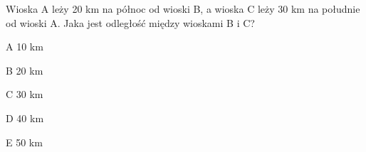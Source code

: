 \begin{tresc}
Wioska A leży 20 km na północ od wioski B, a wioska C leży 30 km na południe od wioski A. Jaka jest odległość między wioskami B i C?
\end{tresc}
\begin{wariant}{A} 10 km \end{wariant}
\begin{wariant}{B} 20 km \end{wariant}
\begin{wariant}{C} 30 km \end{wariant}
\begin{wariant}{D} 40 km \end{wariant}
\begin{wariant}{E} 50 km \end{wariant}
